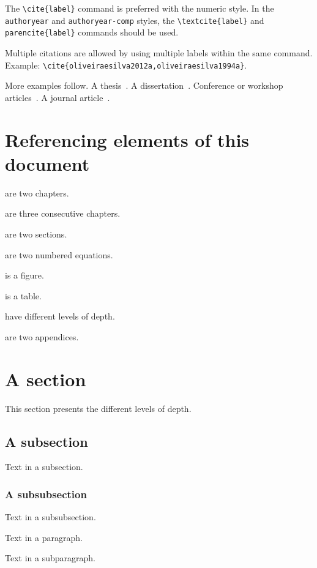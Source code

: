 The \verb+\cite{label}+ command is preferred with the numeric style.
In the \texttt{authoryear} and \texttt{authoryear-comp} styles, the \verb+\textcite{label}+ and \verb+parencite{label}+ commands should be used.

Multiple citations are allowed by using multiple labels within the same command.
Example: \verb+\cite{oliveiraesilva2012a,oliveiraesilva1994a}+.

More examples follow.
A  thesis~\parencite{oliveiraesilva1994a}.
A  dissertation~\parencite{antunes2015a}.
Conference or workshop articles~\parencite{antunes2019a,antunes2020a,almeida2021a}.
A journal article~\parencite{antunes2019b}.


\section{Referencing elements of this document}
\label{c3:s:referencing-elements-of-this-document}

 are two chapters.

 are three consecutive chapters.

 are two sections.

 are two numbered equations.

 is a figure.

 is a table.

 have different levels of depth.

 are two appendices.


\section{A section}
\label{c3:s:a-section}

This section presents the different levels of depth.


\subsection{A subsection}
\label{c3:ss:a-subsection}

Text in a subsection.


\subsubsection{A subsubsection}

Text in a subsubsection.



Text in a paragraph.



Text in a subparagraph.
